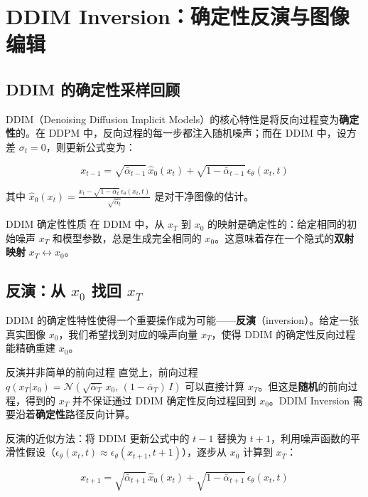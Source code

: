 \section{DDIM Inversion：确定性反演与图像编辑}

\subsection{DDIM 的确定性采样回顾}

DDIM（Denoising Diffusion Implicit Models）的核心特性是将反向过程变为\textbf{确定性}的。在 DDPM 中，反向过程的每一步都注入随机噪声；而在 DDIM 中，设方差 $\sigma_t = 0$，则更新公式变为：

$$
x_{t-1} = \sqrt{\bar\alpha_{t-1}}\,\hat{x}_0(x_t) + \sqrt{1-\bar\alpha_{t-1}}\,\epsilon_\theta(x_t, t)
$$

其中 $\hat{x}_0(x_t) = \frac{x_t - \sqrt{1-\bar\alpha_t}\,\epsilon_\theta(x_t, t)}{\sqrt{\bar\alpha_t}}$ 是对干净图像的估计。

\begin{importantbox}{DDIM 确定性性质}
在 DDIM 中，从 $x_T$ 到 $x_0$ 的映射是确定性的：给定相同的初始噪声 $x_T$ 和模型参数，总是生成完全相同的 $x_0$。这意味着存在一个隐式的\textbf{双射映射} $x_T \leftrightarrow x_0$。
\end{importantbox}

\subsection{反演：从 $x_0$ 找回 $x_T$}

DDIM 的确定性特性使得一个重要操作成为可能——\textbf{反演}（inversion）。给定一张真实图像 $x_0$，我们希望找到对应的噪声向量 $x_T$，使得 DDIM 的确定性反向过程能精确重建 $x_0$。

\begin{warningbox}{反演并非简单的前向过程}
直觉上，前向过程 $q(x_T|x_0) = \mathcal{N}(\sqrt{\bar\alpha_T}\,x_0,\, (1-\bar\alpha_T)\,I)$ 可以直接计算 $x_T$。但这是\textbf{随机}的前向过程，得到的 $x_T$ 并不保证通过 DDIM 确定性反向过程回到 $x_0$。DDIM Inversion 需要沿着\textbf{确定性}路径反向计算。
\end{warningbox}

反演的近似方法：将 DDIM 更新公式中的 $t-1$ 替换为 $t+1$，利用噪声函数的平滑性假设（$\epsilon_\theta(x_t, t) \approx \epsilon_\theta(x_{t+1}, t+1)$），逐步从 $x_0$ 计算到 $x_T$：

$$
x_{t+1} = \sqrt{\bar\alpha_{t+1}}\,\hat{x}_0(x_t) + \sqrt{1-\bar\alpha_{t+1}}\,\epsilon_\theta(x_t, t)
$$

